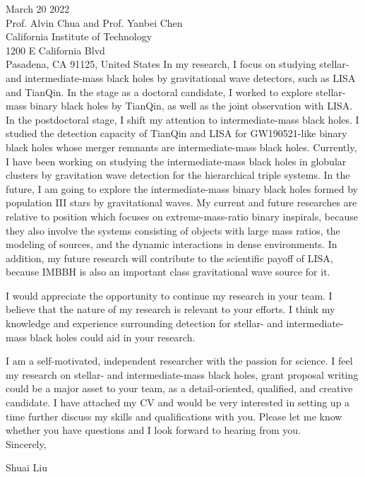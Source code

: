 \documentclass[11pt,a4paper,sans]{letter} %
\begin{document}
\begin{letter}{March 20 2022 \\
Prof. Alvin Chua and Prof. Yanbei Chen \\
California Institute of Technology \\
1200 E California Blvd \\ 
Pasadena, CA 91125, United States}
In my research, I focus on studying stellar- and intermediate-mass black holes by gravitational wave detectors, such
as LISA and TianQin. In the stage as a doctoral candidate, I worked to explore stellar-mass
binary black holes by TianQin, as well as the joint observation with LISA. In the postdoctoral stage, I shift my
attention to intermediate-mass black holes. I studied the detection capacity of TianQin and LISA for
GW190521-like binary black holes whose merger remnants are intermediate-mass black holes. Currently, I have been
working on studying the intermediate-mass black holes in globular clusters by gravitation wave detection for the
hierarchical triple systems. In the future, I am going to explore the intermediate-mass binary black holes formed by
population III stars by gravitational waves. My current and future researches are relative to position which focuses on extreme-mass-ratio binary inspirals, because they also involve the systems consisting of objects
with large mass ratios, the modeling of sources, and the dynamic
interactions in dense environments. In addition, my future research will contribute to the
scientific payoff of LISA, because IMBBH is also an important class gravitational wave
source for it.

I would appreciate the opportunity to continue my research in your team. I
believe that the nature of my research is relevant to your efforts. I think my knowledge and
experience surrounding detection for stellar- and intermediate-mass black holes could aid in your research.

I am a self-motivated, independent researcher with the passion for science. I feel my research on stellar- and
intermediate-mass black holes, grant proposal writing could be a major asset to your team, as a detail-oriented,
qualified, and creative candidate. I have attached my CV and would be very interested in setting up a time further
discuss my skills and qualifications with you. Please let me know whether you have questions and I look forward to
hearing from you.\\


Sincerely,

Shuai Liu




\end{letter}
\end{document}
